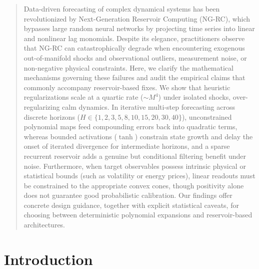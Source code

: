 \documentclass[aip,cha,reprint,amsmath,amssymb]{revtex4-2}
\begin{document}
\maketitle

\begin{quotation}
Data-driven forecasting of complex dynamical systems has been revolutionized by Next-Generation Reservoir Computing (NG-RC), which bypasses large random neural networks by projecting time series into linear and nonlinear lag monomials. Despite its elegance, practitioners observe that NG-RC can catastrophically degrade when encountering exogenous out-of-manifold shocks and observational outliers, measurement noise, or non-negative physical constraints. Here, we clarify the mathematical mechanisms governing these failures and audit the empirical claims that commonly accompany reservoir-based fixes. We show that heuristic regularizations scale at a quartic rate ($\sim M^4$) under isolated shocks, over-regularizing calm dynamics. In iterative multi-step forecasting across discrete horizons ($H \in \{1,2,3,5,8,10,15,20,30,40\}$), unconstrained polynomial maps feed compounding errors back into quadratic terms, whereas bounded activations ($\tanh$) constrain state growth and delay the onset of iterated divergence for intermediate horizons, and a sparse recurrent reservoir adds a genuine but conditional filtering benefit under noise. Furthermore, when target observables possess intrinsic physical or statistical bounds (such as volatility or energy prices), linear readouts must be constrained to the appropriate convex cones, though positivity alone does not guarantee good probabilistic calibration. Our findings offer concrete design guidance, together with explicit statistical caveats, for choosing between deterministic polynomial expansions and reservoir-based architectures.
\end{quotation}

\section{Introduction}
\label{sec:intro}
\end{document}
